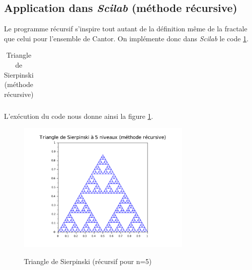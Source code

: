 \documentclass[a4paper,10pt]{report}
\begin{document}
\subsection{Application dans \textit{Scilab} (méthode récursive)}
Le programme récursif s'inspire tout autant de la définition même de la fractale que celui pour l'ensemble de Cantor. On implémente donc dans \textit{Scilab} le code \ref{code_sierp}.
\begin{table}[H]
\caption{Triangle de Sierpinski (méthode récursive)}
\begin{tabular}{l}
\\
\end{tabular}
\label{code_sierp}
\end{table}
L'exécution du code nous donne ainsi la figure \ref{sierpinski_recursif}.
\begin{figure}[H]
\centering
\caption{Triangle de Sierpinski (récursif pour n=5)}
\includegraphics[width=0.75\textwidth]{sierpinski_recursif.pdf}
\label{sierpinski_recursif}
\end{figure}

\newpage
\end{document}

